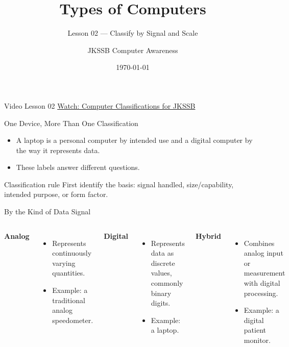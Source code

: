 \documentclass[aspectratio=169]{beamer}
\title{Types of Computers}
\subtitle{Lesson 02 --- Classify by Signal and Scale}
\author{JKSSB Computer Awareness}
\date{\today}
\begin{document}
\frame{\titlepage}

\begin{frame}{Video Lesson 02}
  \centering
  \Large\href{https://youtu.be/d6zL3YS69kM}{Watch: Computer Classifications for JKSSB}
\end{frame}

\begin{frame}{One Device, More Than One Classification}
  \begin{itemize}
    \item A laptop is a personal computer by intended use and a digital
      computer by the way it represents data.
    \item These labels answer different questions.
  \end{itemize}
  \begin{block}{Classification rule}
    First identify the basis: signal handled, size/capability, intended
    purpose, or form factor.
  \end{block}
\end{frame}

\begin{frame}{By the Kind of Data Signal}
  \begin{columns}[T]
      \textbf{Analog}
      \begin{itemize}
        \item Represents continuously varying quantities.
        \item Example: a traditional analog speedometer.
      \end{itemize}
      \textbf{Digital}
      \begin{itemize}
        \item Represents data as discrete values, commonly binary digits.
        \item Example: a laptop.
      \end{itemize}
      \textbf{Hybrid}
      \begin{itemize}
        \item Combines analog input or measurement with digital processing.
        \item Example: a digital patient monitor.
      \end{itemize}
  \end{columns}
\end{frame}
\end{document}
